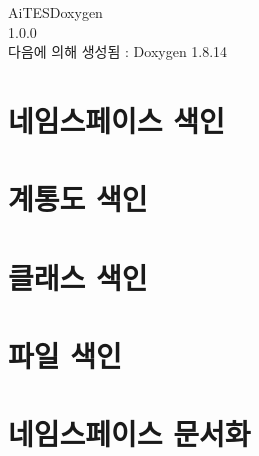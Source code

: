 \documentclass[twoside]{book}
\newcommand{\+}{\discretionary{\mbox{\scriptsize$\hookleftarrow$}}{}{}}
\newcommand{\clearemptydoublepage}{%
  \newpage{\pagestyle{empty}\cleardoublepage}%
}
\begin{document}
\hypersetup{pageanchor=false,
             bookmarksnumbered=true,
             pdfencoding=unicode
            }
\begin{titlepage}
\vspace*{7cm}
\begin{center}%
{\Large Ai\+T\+E\+S\+Doxygen \\[1ex]\large 1.\+0.\+0 }\\
\vspace*{1cm}
{\large 다음에 의해 생성됨 \+:  Doxygen 1.8.14}\\
\end{center}
\end{titlepage}
\clearemptydoublepage
{}
\tableofcontents
\clearemptydoublepage
{}
\hypersetup{pageanchor=true}

\chapter{네임스페이스 색인}

\chapter{계통도 색인}

\chapter{클래스 색인}

\chapter{파일 색인}

\chapter{네임스페이스 문서화}




















\end{document}
